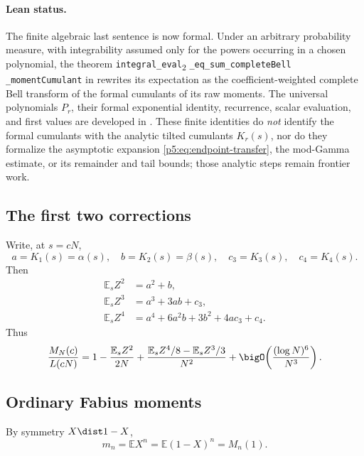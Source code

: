 \documentclass[11pt]{article}
\numberwithin{equation}{section}
\theoremstyle{definition}
\theoremstyle{remark}
\newcommand{\E}{\mathbb E}
\begin{document}
\paragraph{Lean status.}
The finite algebraic last sentence is now formal.  Under an arbitrary
probability measure, with integrability assumed only for the powers occurring
in a chosen polynomial, the theorem
\texttt{integral\_eval}\textsubscript{2}\allowbreak
\texttt{\_eq\_sum\_completeBell}\allowbreak
\texttt{\_momentCumulant} in
 rewrites its expectation as the
coefficient-weighted complete Bell transform of the formal cumulants of its
raw moments.  The universal polynomials \(P_r\), their formal exponential
identity, recurrence, scalar evaluation, and first values are developed in
.  These finite identities do
\emph{not} identify the formal cumulants with the analytic tilted cumulants
\(K_r(s)\), nor do they formalize the asymptotic expansion
\eqref{p5:eq:endpoint-transfer}, the mod-Gamma estimate, or its remainder and
tail bounds; those analytic steps remain frontier work.

\subsection{The first two corrections}

Write, at $s=cN$,
\begin{equation}\label{p5:eq:abcd}
 a=K_1(s)=\alpha(s),\quad b=K_2(s)=\beta(s),\quad
 c_3=K_3(s),\quad c_4=K_4(s).
\end{equation}
Then
\begin{align}
 \E_sZ^2&=a^2+b,\label{p5:eq:raw2}\\
 \E_sZ^3&=a^3+3ab+c_3,\label{p5:eq:raw3}\\
 \E_sZ^4&=a^4+6a^2b+3b^2+4ac_3+c_4.\label{p5:eq:raw4}
\end{align}
Thus
\begin{equation}\label{p5:eq:transfer-second}
 \frac{M_N(c)}{L(cN)}=
 1-\frac{\E_sZ^2}{2N}
 +\frac{\E_sZ^4/8-\E_sZ^3/3}{N^2}
 +\bigO\!\left(\frac{(\log N)^6}{N^3}\right).
\end{equation}

\subsection{Ordinary Fabius moments}

By symmetry $X\dist1-X$,
\begin{equation}\label{p5:eq:mn-M}
 m_n=\E X^n=\E(1-X)^n=M_n(1).
\end{equation}
\end{document}
